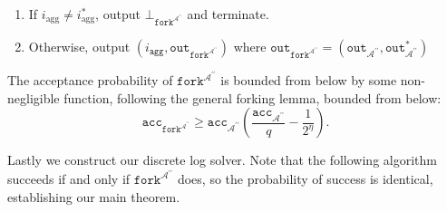 \documentclass{iacrtrans}
\theoremstyle{definition}
\numberwithin{theorem}{subsection}
\numberwithin{lemma}{theorem}
\newcommand{\adversary}{\mathcal{A}}
\begin{document}
\begin{description}
\begin{enumerate}
\item If $i_{\text{agg}} \neq i_{\text{agg}}^*$, output $\bot_{\texttt{fork}^{\adversary^{\prime \prime}}}$ and terminate. 

\item Otherwise, output $(i_{\texttt{agg}}, \texttt{out}_{\texttt{fork}^{\adversary^{\prime \prime}}})$ where $\texttt{out}_{\texttt{fork}^{\adversary^{\prime \prime}}} = (\texttt{out}_{\adversary^{\prime \prime}}, \texttt{out}_{\adversary^{\prime \prime}}^*)$
\end{enumerate}

\end{description}


The acceptance probability of $\texttt{fork}^{\adversary^{\prime \prime}}$ is bounded from below by some non-negligible function, following the general forking lemma, bounded from below:
\[\texttt{acc}_{\texttt{fork}^{\adversary^{\prime \prime}}}
\geq  \texttt{acc}_{\adversary^{\prime\prime}} \left(\frac{\texttt{acc}_{\adversary^{\prime\prime}}}{q} - \frac{1}{2^\eta}\right).\]

Lastly we construct our discrete log solver. Note that the following algorithm succeeds if and only if $\texttt{fork}^{\adversary^{\prime \prime}}$ does, so the probability of success is identical, establishing our main theorem.
\end{document}
